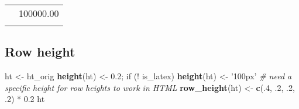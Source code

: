 \documentclass[]{article}
\newenvironment{Shaded}{\begin{snugshade}}{\end{snugshade}}
\newcommand{\KeywordTok}[1]{\textcolor[rgb]{0.13,0.29,0.53}{\textbf{{#1}}}}
\newcommand{\DecValTok}[1]{\textcolor[rgb]{0.00,0.00,0.81}{{#1}}}
\newcommand{\FloatTok}[1]{\textcolor[rgb]{0.00,0.00,0.81}{{#1}}}
\newcommand{\StringTok}[1]{\textcolor[rgb]{0.31,0.60,0.02}{{#1}}}
\newcommand{\CommentTok}[1]{\textcolor[rgb]{0.56,0.35,0.01}{\textit{{#1}}}}
\newcommand{\NormalTok}[1]{{#1}}
\begin{document}
\begin{table}[h]
\begin{centering}
\begin{tabularx}{0.25\textwidth}{p{} p{}}
\hhline{>{\arrayrulecolor{black}}|>{\arrayrulecolor{black}}->{\arrayrulecolor{black}}|>{\arrayrulecolor{black}}-}
\arrayrulecolor{black}
\multicolumn{1}{|p{0.2\textwidth}|}{\raggedright\rule{0pt}{\baselineskip+4pt}\hspace*{4pt}Thyme\hspace*{4pt}\rule[-4pt]{0pt}{4pt}} & \multicolumn{1}{p{0.05\textwidth}|}{\raggedright\rule{0pt}{\baselineskip+4pt}\hspace*{4pt}100000.00\hspace*{4pt}\rule[-4pt]{0pt}{4pt}} \tabularnewline[-0.5pt]
\hhline{>{\arrayrulecolor{black}}|>{\arrayrulecolor{black}}->{\arrayrulecolor{black}}|>{\arrayrulecolor{black}}-}
\arrayrulecolor{black}
\end{tabularx}
\par\end{centering}
\end{table}

\FloatBarrier

\subsection{Row height}\label{row-height}

\begin{Shaded}
\begin{Highlighting}[]
\NormalTok{ht <-}\StringTok{ }\NormalTok{ht_orig}
\KeywordTok{height}\NormalTok{(ht) <-}\StringTok{ }\FloatTok{0.2}\NormalTok{; }
\NormalTok{if (!}\StringTok{ }\NormalTok{is_latex) }\KeywordTok{height}\NormalTok{(ht) <-}\StringTok{ '100px'} \CommentTok{# need a specific height for row heights to work in HTML}
\KeywordTok{row_height}\NormalTok{(ht) <-}\StringTok{ }\KeywordTok{c}\NormalTok{(.}\DecValTok{4}\NormalTok{, .}\DecValTok{2}\NormalTok{, .}\DecValTok{2}\NormalTok{, .}\DecValTok{2}\NormalTok{) *}\StringTok{ }\FloatTok{0.2}
\NormalTok{ht}
\end{Highlighting}
\end{Shaded}
\end{document}
